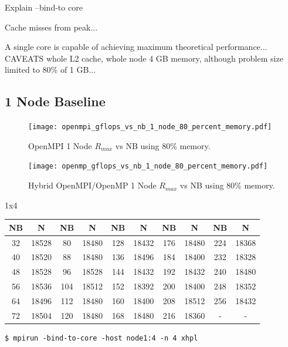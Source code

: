 \documentclass{report}
\begin{document}
Explain --bind-to core

Cache misses from peak...

A single core is capable of achieving maximum theoretical performance... CAVEATS whole L2 cache, whole node 4 GB memory, although problem size limited to 80\% of 1 GB...  


%
%
\subsection{1 Node Baseline}

\begin{figure}
	\centering	
	\texttt{[image: openmpi\_gflops\_vs\_nb\_1\_node\_80\_percent\_memory.pdf]}
	\caption{OpenMPI 1 Node $R_{max}$ vs NB using 80\% memory.}
\end{figure}


\begin{figure}
	\centering	
	\texttt{[image: openmp\_gflops\_vs\_nb\_1\_node\_80\_percent\_memory.pdf]}
	\caption{Hybrid OpenMPI/OpenMP 1 Node $R_{max}$ vs NB using 80\% memory.}
\end{figure}




1x4

\begin{center}
	\begin{tabular}{ |c|c|c|c|c|c|c|c|c|c| } 
		\hline
		NB & N & NB & N & NB & N & NB & N & NB & N \\ 
		\hline
		32 & 18528 &  80 & 18480 & 128 & 18432 & 176 & 18480 & 224 & 18368 \\ 
		40 & 18520 &  88 & 18480 & 136 & 18496 & 184 & 18400 & 232 & 18328 \\ 
 		48 & 18528 &  96 & 18528 & 144 & 18432 & 192 & 18432 & 240 & 18480 \\
		56 & 18536 & 104 & 18512 & 152 & 18392 & 200 & 18400 & 248 & 18352 \\ 
 		64 & 18496 & 112 & 18480 & 160 & 18400 & 208 & 18512 & 256 & 18432 \\
		72 & 18504 & 120 & 18480 & 168 & 18480 & 216 & 18360 &   - &     - \\ 
 		\hline
	\end{tabular}
\end{center}

\lstset{style=type}
\begin{lstlisting}[]
$ mpirun -bind-to-core -host node1:4 -n 4 xhpl
\end{lstlisting}
\end{document}
